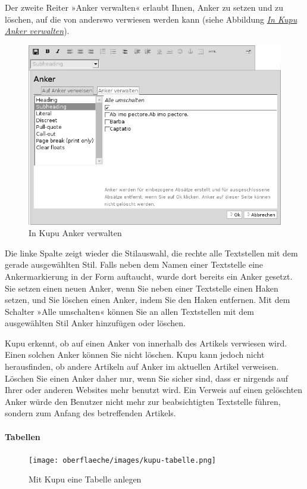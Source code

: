 \documentclass[a4paper,12pt,ngerman]{manual}
\begin{document}
Der zweite Reiter »Anker verwalten« erlaubt Ihnen, Anker zu setzen und zu
löschen, auf die von anderswo verwiesen werden kann (siehe
Abbildung \hyperlink{fig-kupu-anker-verwalten}{\emph{In Kupu Anker verwalten}}).
\hypertarget{fig-kupu-anker-verwalten}{}\begin{figure}[htbp]
\centering

\includegraphics{kupu-anker-verwalten.png}
\caption{In Kupu Anker verwalten}\end{figure}

Die linke Spalte zeigt wieder die Stilauswahl, die rechte alle Textstellen mit
dem gerade ausgewählten Stil. Falls neben dem Namen einer Textstelle eine
Ankermarkierung in der Form  auftaucht, wurde dort
bereits ein Anker gesetzt. Sie setzen einen neuen Anker, wenn Sie neben einer
Textstelle einen Haken setzen, und Sie löschen einen Anker, indem Sie den Haken
entfernen. Mit dem Schalter »Alle umschalten« können Sie an allen Textstellen
mit dem ausgewählten Stil Anker hinzufügen oder löschen.

Kupu erkennt, ob auf einen Anker von innerhalb des Artikels verwiesen wird.
Einen solchen Anker können Sie nicht löschen. Kupu kann jedoch nicht
herausfinden, ob andere Artikeln auf Anker im aktuellen Artikel verweisen.
Löschen Sie einen Anker daher nur, wenn Sie sicher sind, dass er
nirgends auf Ihrer oder anderen Websites mehr benutzt wird. Ein Verweis auf
einen gelöschten Anker würde den Benutzer nicht mehr zur beabsichtigten
Textstelle führen, sondern zum Anfang des betreffenden Artikels.


\paragraph{Tabellen}
\hypertarget{fig-kupu-tabelle}{}\begin{figure}[htbp]
\centering

\texttt{[image: oberflaeche/images/kupu-tabelle.png]}
\caption{Mit Kupu eine Tabelle anlegen}\end{figure}
\end{document}
